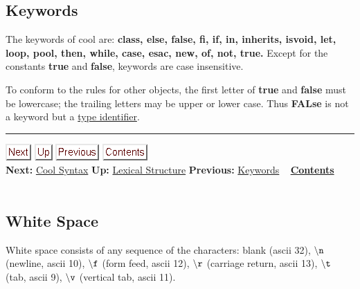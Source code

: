 \documentclass[]{article}
\begin{document}
\subsection{Keywords}

The keywords of cool are: \textbf{class, else, false, fi, if, in,
inherits, isvoid, let, loop, pool, then, while, case, esac, new, of,
not, true.} Except for the constants \textbf{true} and \textbf{false},
keywords are case insensitive.

To conform to the rules for other objects, the first letter of
\textbf{true} and \textbf{false} must be lowercase; the trailing letters
may be upper or lower case. Thus \textbf{FALse} is not a keyword but a
\href{node34.html}{type identifier}.

\begin{center}\rule{3in}{0.4pt}\end{center}

\href{node39.html}{\includegraphics{next.png}}
\href{node33.html}{\includegraphics{up.png}}
\href{node37.html}{\includegraphics{prev.png}}
\href{node1.html}{\includegraphics{contents.png}} \\ \textbf{Next:}
\href{node39.html}{Cool Syntax} \textbf{Up:} \href{node33.html}{Lexical
Structure} \textbf{Previous:} \href{node37.html}{Keywords} ~
\textbf{\href{node1.html}{Contents}} \\ \\

\subsection{White Space}

White space consists of any sequence of the characters: blank (ascii
32), $\tt\backslash n$ (newline, ascii 10), $\tt\backslash f$ (form
feed, ascii 12), $\tt\backslash r$ (carriage return, ascii 13),
$\tt\backslash t$ (tab, ascii 9), $\tt\backslash v$ (vertical tab, ascii
11). \\
\end{document}

